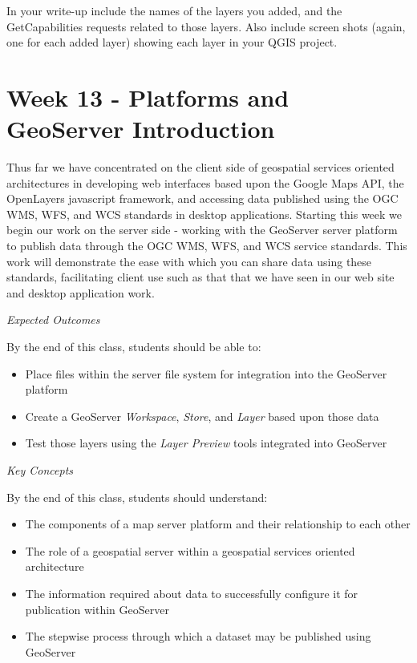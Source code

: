 \documentclass[]{book}
\providecommand{\tightlist}{%
  \setlength{\itemsep}{0pt}\setlength{\parskip}{0pt}}
\begin{document}
In your write-up include the names of the layers you added, and the
GetCapabilities requests related to those layers. Also include screen
shots (again, one for each added layer) showing each layer in your QGIS
project.  

\chapter{Week 13 - Platforms and GeoServer Introduction}\label{week13}

Thus far we have concentrated on the client side of geospatial services
oriented architectures in developing web interfaces based upon the
Google Maps API, the OpenLayers javascript framework, and accessing data
published using the OGC WMS, WFS, and WCS standards in desktop
applications. Starting this week we begin our work on the server side -
working with the GeoServer server platform to publish data through the
OGC WMS, WFS, and WCS service standards. This work will demonstrate the
ease with which you can share data using these standards, facilitating
client use such as that that we have seen in our web site and desktop
application work.

\emph{Expected Outcomes}

By the end of this class, students should be able to:

\begin{itemize}
\tightlist
\item
  Place files within the server file system for integration into the
  GeoServer platform
\item
  Create a GeoServer \emph{Workspace}, \emph{Store}, and \emph{Layer}
  based upon those data
\item
  Test those layers using the \emph{Layer Preview} tools integrated into
  GeoServer
\end{itemize}

\emph{Key Concepts}

By the end of this class, students should understand:

\begin{itemize}
\tightlist
\item
  The components of a map server platform and their relationship to each
  other
\item
  The role of a geospatial server within a geospatial services oriented
  architecture
\item
  The information required about data to successfully configure it for
  publication within GeoServer
\item
  The stepwise process through which a dataset may be published using
  GeoServer
\end{itemize}
\end{document}
